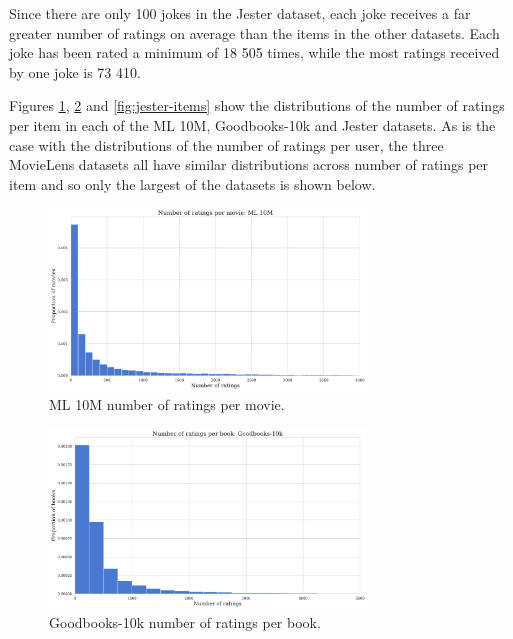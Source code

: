 Since there are only 100 jokes in the Jester dataset, each joke receives a far greater number of ratings on average than the items in the other datasets. Each joke has been rated a minimum of 18 505 times, while the most ratings received by one joke is 73 410.

Figures \ref{fig:ML10M-items}, \ref{fig:goodbooks-items} and \ref{fig:jester-items} show the distributions of the number of ratings per item in each of the ML 10M, Goodbooks-10k and Jester datasets. As is the case with the distributions of the number of ratings per user, the three MovieLens datasets all have similar distributions across number of ratings per item and so only the largest of the datasets is shown below.

\begin{figure}[H]
\centering
\includegraphics[width=0.75\textwidth]{Figures/3_ratings-distributions/ml_10m_movie-ratings.pdf}
\caption{ML 10M number of ratings per movie.}
\label{fig:ML10M-items}
\end{figure}

\begin{figure}[H]
\centering
\includegraphics[width=0.75\textwidth]{Figures/3_ratings-distributions/goodbooks-ratings.pdf}
\caption{Goodbooks-10k number of ratings per book.}
\label{fig:goodbooks-items}
\end{figure}

